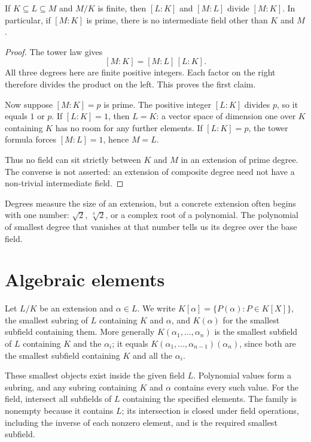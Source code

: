 \begin{corollary}\label{cor:towerdiv}
If $K\subseteq L\subseteq M$ and $M/K$ is finite, then $[L:K]$ and $[M:L]$ divide $[M:K]$. In particular, if $[M:K]$ is prime, there is no intermediate field other than $K$ and $M$.
\end{corollary}
\begin{proof}
The tower law gives
\[
[M:K]=[M:L]\,[L:K].
\]
All three degrees here are finite positive integers.
Each factor on the right therefore divides
the product on the left. This proves the first claim.

Now suppose $[M:K]=p$ is prime.
The positive integer $[L:K]$ divides $p$,
so it equals $1$ or $p$.
If $[L:K]=1$, then $L=K$: a vector space
of dimension one over $K$ containing $K$
has no room for any further elements.
If $[L:K]=p$, the tower formula forces
$[M:L]=1$, hence $M=L$.

Thus no field can sit strictly between
$K$ and $M$ in an extension of prime degree.
The converse is not asserted: an extension
of composite degree need not have a
non-trivial intermediate field.
\end{proof}

Degrees measure the size of an extension, but a concrete extension often begins with one number: $\sqrt2$, $\sqrt[3]2$, or a complex root of a polynomial. The polynomial of smallest degree that vanishes at that number tells us its degree over the base field.

\section{Algebraic elements}

Let $L/K$ be an extension and $\alpha\in L$. We write $K[\alpha]=\{P(\alpha):P\in K[X]\}$, the smallest subring of $L$ containing $K$ and $\alpha$, and $K(\alpha)$ for the smallest subfield containing them. More generally $K(\alpha_1,\dots,\alpha_n)$ is the smallest subfield of $L$ containing $K$ and the $\alpha_i$; it equals $K(\alpha_1,\dots,\alpha_{n-1})(\alpha_n)$, since both are the smallest subfield containing $K$ and all the $\alpha_i$.

These smallest objects exist inside the given field $L$. Polynomial
values form a subring, and any subring containing $K$ and $\alpha$
contains every such value. For the field, intersect all subfields of
$L$ containing the specified elements. The family is nonempty because
it contains $L$; its intersection is closed under field operations,
including the inverse of each nonzero element, and is the required
smallest subfield.

